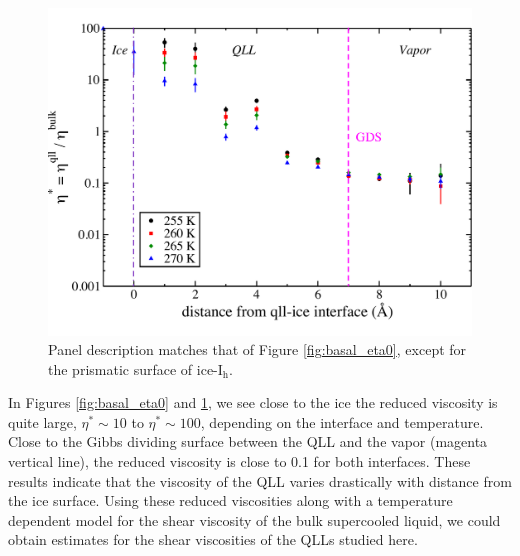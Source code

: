 \begin{figure}
\includegraphics[width=\linewidth]{Figures/prism_eta0}
\caption{\label{fig:prism_eta0} Panel description matches that of
  Figure \ref{fig:basal_eta0}, except for the prismatic surface of
  ice-I$_\mathrm{h}$.}
\end{figure}                

In Figures \ref{fig:basal_eta0} and \ref{fig:prism_eta0}, we see close
to the ice the reduced viscosity is quite large, $\eta^* \sim 10$ to
$\eta^* \sim 100$, depending on the interface and temperature. Close
to the Gibbs dividing surface between the QLL and the vapor (magenta
vertical line), the reduced viscosity is close to 0.1 for both
interfaces. These results indicate that the viscosity of the QLL
varies drastically with distance from the ice surface. Using these
reduced viscosities along with a temperature dependent model for the
shear viscosity of the bulk supercooled liquid, we could obtain
estimates for the shear viscosities of the QLLs studied here.
           
